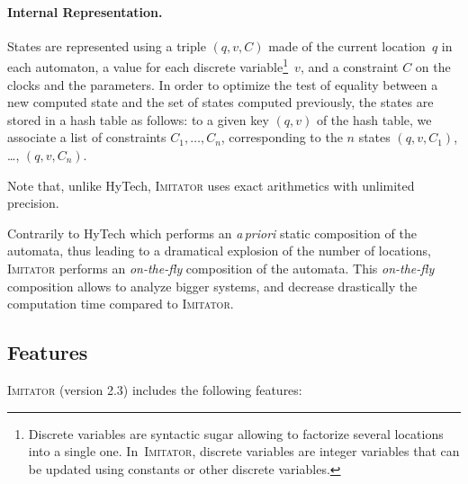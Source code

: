 \documentclass[a4paper,10pt]{article}
\newcommand{\hytech}{{\sc HyTech}}
\newcommand{\imitator}{\textsc{Imitator}}
\newcommand{\imitatorversion}{2.3}
\newcommand{\paragraphe}[1]{\paragraph{#1.}}
\begin{document}
\paragraphe{Internal Representation}
States are represented using a triple $(q, v, C)$ made of the current location~$q$ in each automaton, a value for each discrete variable\footnote{Discrete variables are syntactic sugar allowing to factorize several locations into a single one. In~\imitator{}, discrete variables are integer variables that can be updated using constants or other discrete variables.}~$v$, and a constraint $C$ on the clocks and the parameters.
In order to optimize the test of equality between a new computed state and the set of states computed previously, the states are stored in a hash table as follows:
to a given key $(q, v)$ of the hash table, we associate a list of constraints $C_1, \dots, C_n$, corresponding to the $n$ states $(q, v, C_1)$, \dots, $(q, v, C_n)$.

Note that, unlike \hytech{}, \imitator{} uses exact arithmetics with unlimited precision.

Contrarily to \hytech{} which performs an \emph{a\,priori} static composition of the automata, thus leading to a dramatical explosion of the number of locations, \imitator{} performs an \emph{on-the-fly} composition of the automata.
This \emph{on-the-fly} composition allows to analyze bigger systems, and decrease drastically the computation time compared to \imitator{}. %




\subsection{Features} \label{ss:features}

\imitator{} (version \imitatorversion{}) includes the following features:
\end{document}
